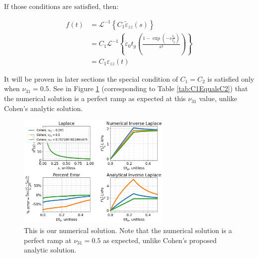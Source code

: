 \documentclass{article}
\newcommand{\laplace}[2][]{\mathscr{L}^{#1}\left\{ #2\right\}}
\newcommand{\ilaplace}[1]{\laplace[-1]{#1}}
\begin{document}
$\text{If those conditions are satisfied, then:}$

\begin{align}
f(t) &= \ilaplace{C_1 \tilde{\varepsilon}_{zz}(s)} \\
&= C_1 \ilaplace{\dot{\varepsilon}_{0} t_{g} \left( \frac{1-\exp \left(-s \frac{t_{0}}{t_{g}}\right)}{s^{2}} \right)} \\
&= C_1 \varepsilon_{zz}(t)
\end{align}

It will be proven in later sections the special condition of $C_1=C_2$ is satisfied only when $\nu_{31}=0.5$. See in Figure \ref{fig:C1EqualsC2} (corresponding to Table \ref{tab:C1EqualsC2}) that the numerical solution is a perfect ramp as expected at this $\nu_{31}$ value, unlike Cohen's analytic solution.


\begin{figure}
\centering
\caption{\label{fig:C1EqualsC2} This is our numerical solution. Note that the numerical solution is a perfect ramp at $\nu_{31}=0.5$ as expected, unlike Cohen's proposed analytic solution.}
\includegraphics[width=0.66\textwidth]{PlotsWhenC1=C2.png}
\end{figure}
\end{document}
